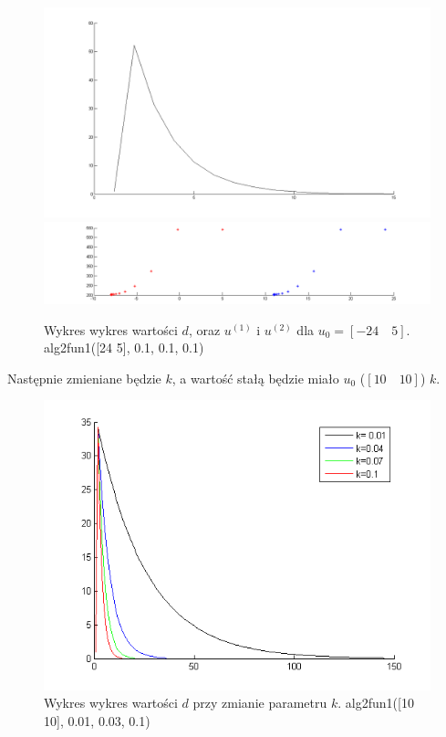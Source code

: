 \documentclass[a4paper,10pt]{article}
\begin{document}
\begin{figure}[!h]
    \centering
	\includegraphics[width=120mm]{CW4-alg2fun1-u-24_5-k01-d.png}
	\includegraphics[width=120mm]{CW4-alg2fun1-u-24_5-k01-u.png}
	\caption{Wykres wykres wartości $d$, oraz $u^{(1)}$ i $u^{(2)}$ dla $u_0=[-24 \quad 5]$. \newline \small alg2fun1([24 5], 0.1, 0.1, 0.1)}
    \label{fig:Rysunek}
\end{figure}

Następnie zmieniane będzie $k$, a wartość stałą będzie miało  $u_0$ ($[10 \quad 10]$) $k$.

\begin{figure}[!h]
    \centering
	\includegraphics[width=120mm]{CW4-alg2fun1-u10_10-k001_01-d.png}
	\caption{Wykres wykres wartości $d$ przy zmianie parametru $k$. \newline \small alg2fun1([10 10], 0.01, 0.03, 0.1)}
    \label{fig:Rysunek}
\end{figure}
\end{document}
